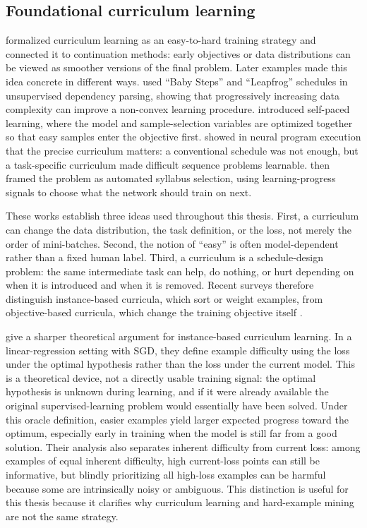 \documentclass[english,master,a4paper,oneside]{ppfcmthesis}
\begin{document}
\subsection{Foundational curriculum learning}
\citet{bengio2009curriculum} formalized curriculum learning as an
easy-to-hard training strategy and connected it to continuation methods: early
objectives or data distributions can be viewed as smoother versions of the final
problem. Later examples made this idea concrete in different ways. \citet{spitkovsky2010baby} used ``Baby Steps'' and ``Leapfrog'' schedules in
unsupervised dependency parsing, showing that progressively increasing data
complexity can improve a non-convex learning procedure. \citet{kumar2010selfpaced} introduced self-paced learning, where the model and
sample-selection variables are optimized together so that easy samples enter the
objective first. \citet{zaremba2014learning} showed in
neural program execution that the precise curriculum matters: a conventional
schedule was not enough, but a task-specific curriculum made difficult sequence
problems learnable. \citet{graves2017automated} then framed the
problem as automated syllabus selection, using learning-progress signals to
choose what the network should train on next.

These works establish three ideas used throughout this thesis. First, a
curriculum can change the data distribution, the task definition, or the loss,
not merely the order of mini-batches. Second, the notion of ``easy'' is often
model-dependent rather than a fixed human label. Third, a curriculum is a
schedule-design problem: the same intermediate task can help, do nothing, or
hurt depending on when it is introduced and when it is removed. Recent surveys
therefore distinguish instance-based curricula, which sort or weight examples,
from objective-based curricula, which change the training objective itself
\citep{soviany2022curriculum,wang2021survey}.

\citet{weinshall2018curriculum} give a sharper theoretical
argument for instance-based curriculum learning. In a linear-regression setting
with SGD, they define example difficulty using the loss under the optimal
hypothesis rather than the loss under the current model. This is a theoretical
device, not a directly usable training signal: the optimal hypothesis is unknown
during learning, and if it were already available the original
supervised-learning problem would essentially have been solved. Under this
oracle definition, easier examples yield larger expected progress toward the
optimum, especially early in training when the model is still far from a good
solution. Their analysis also separates inherent difficulty from current loss:
among examples of equal inherent difficulty, high current-loss points can still
be informative, but blindly prioritizing all high-loss examples can be harmful
because some are intrinsically noisy or ambiguous. This distinction is useful
for this thesis because it clarifies why curriculum learning and hard-example
mining are not the same strategy.
\end{document}
